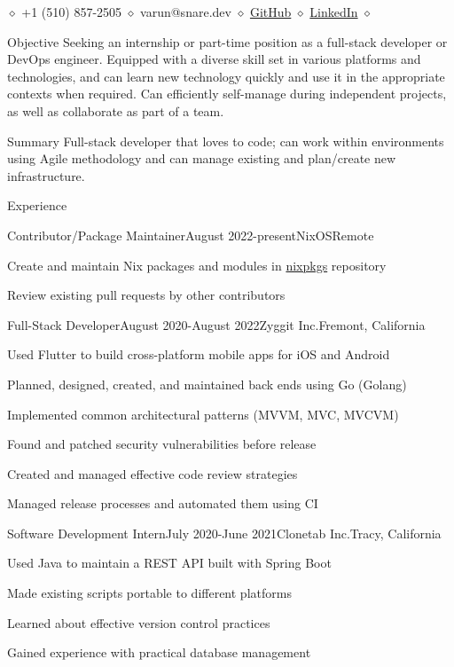\documentclass{resume}
\def \sep {$\diamond$ }
\begin{document}
\centerline{
  \sep +1 (510) 857-2505
  \sep varun@snare.dev
  \sep {\href{https://github.com/water-sucks}{GitHub}}
  \sep {\href{https://www.linkedin.com/in/varun-narravula-a68725249}{LinkedIn}}
  \sep
}

\begin{rSection}{Objective}
  Seeking an internship or part-time position as a full-stack developer or DevOps engineer. Equipped with
  a diverse skill set in various platforms and technologies, and can learn new technology quickly and use it
  in the appropriate contexts when required. Can efficiently self-manage during independent projects, as
  well as collaborate as part of a team.
\end{rSection}

\begin{rSection}{Summary}
  Full-stack developer that loves to code; can work within environments using Agile methodology and can
  manage existing and plan/create new infrastructure.
\end{rSection}

\begin{rSection}{Experience}
  \begin{rSubsection}{Contributor/Package Maintainer}{August 2022-present}{NixOS}{Remote}
    \item{Create and maintain Nix packages and modules in \href{https://github.com/NixOS/nixpkgs}{nixpkgs} repository}
    \item{Review existing pull requests by other contributors}
  \end{rSubsection}
  \begin{rSubsection}{Full-Stack Developer}{August 2020-August 2022}{Zyggit Inc.}{Fremont, California}
    \item{Used Flutter to build cross-platform mobile apps for iOS and Android}
    \item{Planned, designed, created, and maintained back ends using Go (Golang)}
    \item{Implemented common architectural patterns (MVVM, MVC, MVCVM)}
    \item{Found and patched security vulnerabilities before release}
    \item{Created and managed effective code review strategies}
    \item{Managed release processes and automated them using CI}
  \end{rSubsection}
  \begin{rSubsection}{Software Development Intern}{July 2020-June 2021}{Clonetab Inc.}{Tracy, California}
    \item{Used Java to maintain a REST API built with Spring Boot}
    \item{Made existing scripts portable to different platforms}
    \item{Learned about effective version control practices}
    \item{Gained experience with practical database management}
  \end{rSubsection}
\end{rSection}
\end{document}
